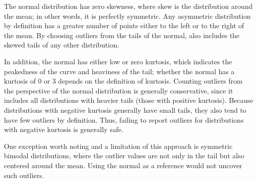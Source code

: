 The normal distribution has zero skewness, where skew is the
distribution around the mean; in other words, it is perfectly
symmetric. Any asymmetric distribution by definition has a greater
number of points either to the left or to the right of the mean. By
choosing outliers from the tails of the normal, \checkcell{} also
includes the skewed tails of any other distribution.

In addition, the normal has either low or zero kurtosis, which
indicates the peakedness of the curve and heaviness of the tail;
whether the normal has a kurtosis of 0 or 3 depends on the definition
of kurtosis. Counting outliers from the perspective of the normal
distribution is generally conservative, since it includes all
distributions with heavier tails (those with positive
kurtosis). Because distributions with negative kurtosis generally have
small tails, they also tend to have few outliers by definition. Thus,
failing to report outliers for distributions with negative kurtosis is
generally safe.

One exception worth noting and a limitation of this approach is
symmetric bimodal distributions, where the outlier values are not only
in the tail but also centered around the mean. Using the normal as a
reference would not uncover such outliers.

